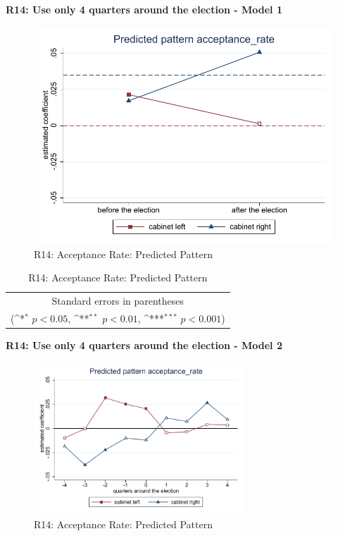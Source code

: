 \documentclass[10pt,a4paper]{scrartcl}
\begin{document}
\clearpage
\textbf{R14: Use only 4 quarters around the election - Model 1}
\begin{figure}[!ht]
	\centering
	\includegraphics[width=1\textwidth]{figures_edited/acceptance_rate_graph1_R14.pdf}
	\caption{R14: Acceptance Rate: Predicted Pattern}
\end{figure}

\begin{table}[!ht]\centering
	\renewcommand{\arraystretch}{1.25}
	\def\sym#1{\ifmmode^{#1}\else\(^{#1}\)\fi}
	\caption{R14: Acceptance Rate: Predicted Pattern}
	\begin{tabular}{l*{2}{c}}
		\hline\hline
		
		\hline\hline
		\multicolumn{3}{c}{\footnotesize Standard errors in parentheses} \\
		\multicolumn{3}{c}{\footnotesize (\sym{*} \(p<0.05\), \sym{**} \(p<0.01\), \sym{***} \(p<0.001\))}\\
	\end{tabular}
\end{table}

\clearpage
\textbf{R14: Use only 4 quarters around the election - Model 2}
\begin{figure}[!ht]
	\centering
	\includegraphics[width=0.7\textwidth]{figures_edited/acceptance_rate_graph2_R14.pdf}
	\caption{R14: Acceptance Rate: Predicted Pattern}
\end{figure}
\end{document}

